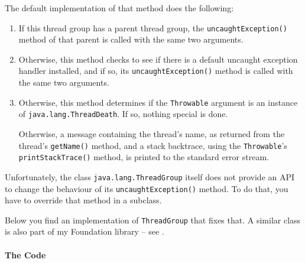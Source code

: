 The default implementation of that method does the following:
\begin{enumerate}
\item{If this thread group has a parent thread group, the \lstinline|uncaughtException()| method of that parent is called with the same two arguments.}
\item{Otherwise, this method checks to see if there is a default uncaught exception handler installed, and if so, its \lstinline|uncaughtException()| method is called with the same two arguments.}
\item{Otherwise, this method determines if the \lstinline|Throwable| argument is an instance of \lstinline|java.lang.ThreadDeath|. If so, nothing special is done.

Otherwise, a message containing the thread's name, as returned from the thread's \lstinline|getName()| method, and a stack backtrace, using the \lstinline|Throwable|'s \lstinline|printStackTrace()| method, is printed to the standard error stream.}
\end{enumerate}

Unfortunately, the class \lstinline|java.lang.ThreadGroup| itself does not provide an API to change the behaviour of its \lstinline|uncaughtException()| method. To do that, you have to override that method in a subclass.

Below you find an implementation of \lstinline|ThreadGroup| that fixes that. A similar class is also part of my Foundation library – see \autocite{TQUADRAT_ORG_FOUNDATION_BASE, TQUADRAT_ORG_FOUNDATION_THREADGROUP}.


\paragraph{The Code} \


